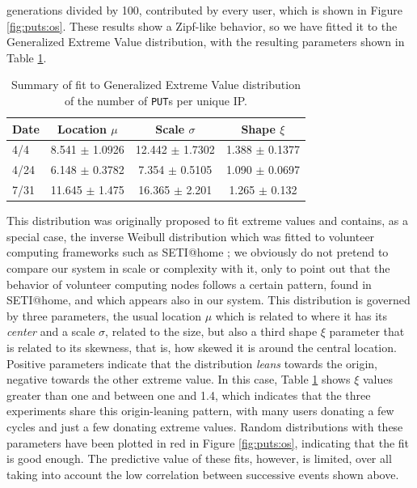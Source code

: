 \documentclass[journal,onecolumn]{IEEEtran}
\begin{document}
generations divided by 100, contributed by every user, which is shown
in Figure \ref{fig:puts:os}. These results show a Zipf-like behavior,
so we have fitted it to the Generalized Extreme Value distribution,
with the resulting parameters shown in Table \ref{tab:puts:os}.
%
\begin{table}
\caption{Summary of fit to Generalized Extreme Value distribution of
  the number of {\tt PUT}s per unique IP. \label{tab:puts:os}}
\begin{center}
\begin{tabular}{l|ccc}
\hline
Date  & Location $\mu$ & Scale $\sigma$ & Shape $\xi$ \\
\hline
4/4 &  8.541 $\pm$ 1.0926  &    12.442 $\pm$ 1.7302 &  1.388 $\pm$
0.1377 \\
4/24 & 6.148 $\pm$ 0.3782 & 7.354 $\pm$ 0.5105 & 1.090 $\pm$  0.0697  \\
7/31 & 11.645 $\pm$ 1.475 & 16.365 $\pm$ 2.201 &  1.265 $\pm$ 0.132   \\
\hline
\end{tabular}
\end{center}
\end{table}
%
This distribution was originally proposed to fit extreme values
\cite{resnick2013extreme} and contains, as a special case, the inverse
Weibull distribution which was fitted to volunteer computing
frameworks such as SETI@home \cite{javadi2009mining}; we obviously do
not pretend to compare our system in scale or complexity with it, only
to point out that the behavior of volunteer computing nodes follows a
certain pattern, found in SETI@home, and which appears also in our system. This
distribution is governed by three parameters, the usual location $\mu$
which is related to where it has its {\em center} and a scale $\sigma$,
related to the size, but also a third shape $\xi$ parameter that is
related to its skewness, that is, how skewed it is around the central
location. Positive parameters indicate that the distribution {\em
  leans} towards the origin, negative towards the other extreme
value. In this case, Table \ref{tab:puts:os} shows $\xi$ values
greater than one and between one and 1.4, which indicates that the
three experiments share this origin-leaning pattern, with many users
donating a few cycles and just a few donating extreme values. Random
distributions with these parameters have been plotted in red in
Figure \ref{fig:puts:os}, indicating that the fit is good enough. The
predictive value of these fits, however, is limited, over all taking
into account the low correlation between successive events shown
above.
\end{document}
